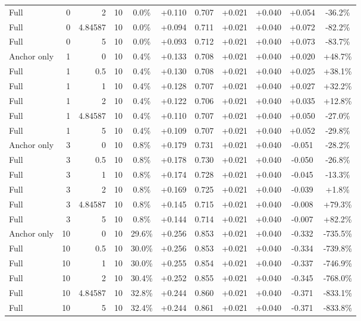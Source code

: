 \begin{table}[htbp]
\begin{tabular}{lrrrccccccc}
Full & 0 & 2 & 10 & 0.0\% & +0.110 & 0.707 & +0.021 & +0.040 & +0.054 & -36.2\% \\
Full & 0 & 4.84587 & 10 & 0.0\% & +0.094 & 0.711 & +0.021 & +0.040 & +0.072 & -82.2\% \\
Full & 0 & 5 & 10 & 0.0\% & +0.093 & 0.712 & +0.021 & +0.040 & +0.073 & -83.7\% \\
Anchor only & 1 & 0 & 10 & 0.4\% & +0.133 & 0.708 & +0.021 & +0.040 & +0.020 & +48.7\% \\
Full & 1 & 0.5 & 10 & 0.4\% & +0.130 & 0.708 & +0.021 & +0.040 & +0.025 & +38.1\% \\
Full & 1 & 1 & 10 & 0.4\% & +0.128 & 0.707 & +0.021 & +0.040 & +0.027 & +32.2\% \\
Full & 1 & 2 & 10 & 0.4\% & +0.122 & 0.706 & +0.021 & +0.040 & +0.035 & +12.8\% \\
Full & 1 & 4.84587 & 10 & 0.4\% & +0.110 & 0.707 & +0.021 & +0.040 & +0.050 & -27.0\% \\
Full & 1 & 5 & 10 & 0.4\% & +0.109 & 0.707 & +0.021 & +0.040 & +0.052 & -29.8\% \\
Anchor only & 3 & 0 & 10 & 0.8\% & +0.179 & 0.731 & +0.021 & +0.040 & -0.051 & -28.2\% \\
Full & 3 & 0.5 & 10 & 0.8\% & +0.178 & 0.730 & +0.021 & +0.040 & -0.050 & -26.8\% \\
Full & 3 & 1 & 10 & 0.8\% & +0.174 & 0.728 & +0.021 & +0.040 & -0.045 & -13.3\% \\
Full & 3 & 2 & 10 & 0.8\% & +0.169 & 0.725 & +0.021 & +0.040 & -0.039 & +1.8\% \\
Full & 3 & 4.84587 & 10 & 0.8\% & +0.145 & 0.715 & +0.021 & +0.040 & -0.008 & +79.3\% \\
Full & 3 & 5 & 10 & 0.8\% & +0.144 & 0.714 & +0.021 & +0.040 & -0.007 & +82.2\% \\
Anchor only & 10 & 0 & 10 & 29.6\% & +0.256 & 0.853 & +0.021 & +0.040 & -0.332 & -735.5\% \\
Full & 10 & 0.5 & 10 & 30.0\% & +0.256 & 0.853 & +0.021 & +0.040 & -0.334 & -739.8\% \\
Full & 10 & 1 & 10 & 30.0\% & +0.255 & 0.854 & +0.021 & +0.040 & -0.337 & -746.9\% \\
Full & 10 & 2 & 10 & 30.4\% & +0.252 & 0.855 & +0.021 & +0.040 & -0.345 & -768.0\% \\
Full & 10 & 4.84587 & 10 & 32.8\% & +0.244 & 0.860 & +0.021 & +0.040 & -0.371 & -833.1\% \\
Full & 10 & 5 & 10 & 32.4\% & +0.244 & 0.861 & +0.021 & +0.040 & -0.371 & -833.8\% \\

\end{tabular}
\end{table}

